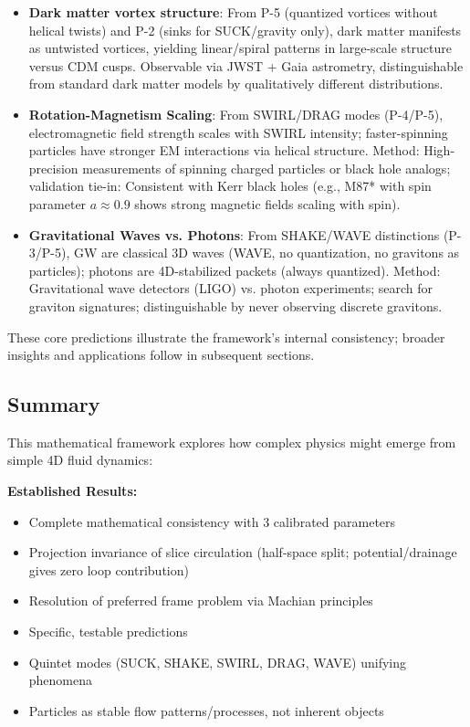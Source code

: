 \begin{itemize}
\item \textbf{Dark matter vortex structure}: From P-5 (quantized vortices without helical twists) and P-2 (sinks for SUCK/gravity only), dark matter manifests as untwisted vortices, yielding linear/spiral patterns in large-scale structure versus CDM cusps. Observable via JWST + Gaia astrometry, distinguishable from standard dark matter models by qualitatively different distributions.
\item \textbf{Rotation-Magnetism Scaling}: From SWIRL/DRAG modes (P-4/P-5), electromagnetic field strength scales with SWIRL intensity; faster-spinning particles have stronger EM interactions via helical structure. Method: High-precision measurements of spinning charged particles or black hole analogs; validation tie-in: Consistent with Kerr black holes (e.g., M87* with spin parameter $a \approx 0.9$ shows strong magnetic fields scaling with spin).
\item \textbf{Gravitational Waves vs. Photons}: From SHAKE/WAVE distinctions (P-3/P-5), GW are classical 3D waves (WAVE, no quantization, no gravitons as particles); photons are 4D-stabilized packets (always quantized). Method: Gravitational wave detectors (LIGO) vs. photon experiments; search for graviton signatures; distinguishable by never observing discrete gravitons.
\end{itemize}

These core predictions illustrate the framework's internal consistency; broader insights and applications follow in subsequent sections.

\subsection{Summary}

This mathematical framework explores how complex physics might emerge from simple 4D fluid dynamics:

\textbf{Established Results:}
\begin{itemize}
\item Complete mathematical consistency with 3 calibrated parameters
\item Projection invariance of slice circulation (half-space split; potential/drainage gives zero loop contribution)
\item Resolution of preferred frame problem via Machian principles
\item Specific, testable predictions
\item Quintet modes (SUCK, SHAKE, SWIRL, DRAG, WAVE) unifying phenomena
\item Particles as stable flow patterns/processes, not inherent objects
\end{itemize}

